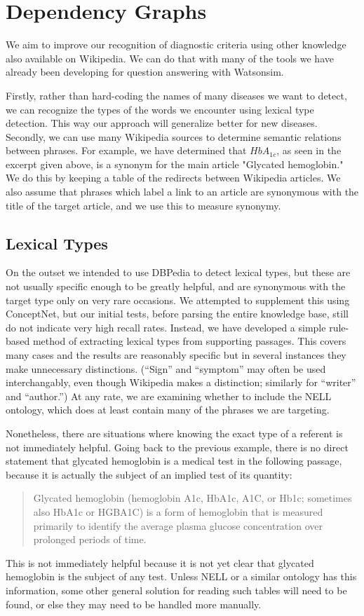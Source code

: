 \documentclass[12pt,letterpaper]{article}
\begin{document}
\section{Dependency Graphs}
We aim to improve our recognition of diagnostic criteria using other knowledge also available on Wikipedia. We can do that with many of the tools we have already been developing for question answering with Watsonsim.

Firstly, rather than hard-coding the names of many diseases we want to detect, we can recognize the types of the words we encounter using lexical type detection. This way our approach will generalize better for new diseases.
Secondly, we can use many Wikipedia sources to determine semantic relations between phrases. For example, we have determined that $HbA_{1c}$, as seen in the excerpt given above, is a synonym for the main article "Glycated hemoglobin." We do this by keeping a table of the redirects between Wikipedia articles. We also assume that phrases which label a link to an article are synonymous with the title of the target article, and we use this to measure synonymy.

\subsection{Lexical Types}
On the outset we intended to use DBPedia to detect lexical types, but these are not usually specific enough to be greatly helpful, and are synonymous with the target type only on very rare occasions. We attempted to supplement this using ConceptNet, but our initial tests, before parsing the entire knowledge base, still do not indicate very high recall rates. Instead, we have developed a simple rule-based method of extracting lexical types from supporting passages. This covers many cases and the results are reasonably specific but in several instances they make unnecessary distinctions. (``Sign'' and ``symptom'' may often be used interchangably, even though Wikipedia makes a distinction; similarly for ``writer'' and ``author.'') At any rate, we are examining whether to include the NELL ontology, which does at least contain many of the phrases we are targeting.

Nonetheless, there are situations where knowing the exact type of a referent is not immediately helpful. Going back to the previous example, there is no direct statement that glycated hemoglobin is a medical test in the following passage, because it is actually the subject of an implied test of its quantity:
\begin{quote}
Glycated hemoglobin (hemoglobin A1c, HbA1c, A1C, or Hb1c; sometimes also HbA1c or HGBA1C) is a form of hemoglobin that is measured primarily to identify the average plasma glucose concentration over prolonged periods of time.
\end{quote}
This is not immediately helpful because it is not yet clear that glycated hemoglobin is the subject of any test. Unless NELL or a similar ontology has this information, some other general solution for reading such tables will need to be found, or else they may need to be handled more manually.
\end{document}
